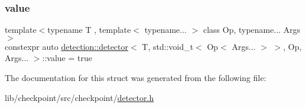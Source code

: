 \subsubsection{\texorpdfstring{value}{value}}
{\footnotesize\ttfamily template$<$typename T , template$<$ typename... $>$ class Op, typename... Args$>$ \\
constexpr auto \hyperlink{structdetection_1_1detector}{detection\+::detector}$<$ T, std\+::void\+\_\+t$<$ Op$<$ Args... $>$ $>$, Op, Args... $>$\+::value = true\hspace{0.3cm}{\ttfamily [static]}}



The documentation for this struct was generated from the following file\+:\begin{DoxyCompactItemize}
\item 
lib/checkpoint/src/checkpoint/\hyperlink{detector_8h}{detector.\+h}\end{DoxyCompactItemize}
